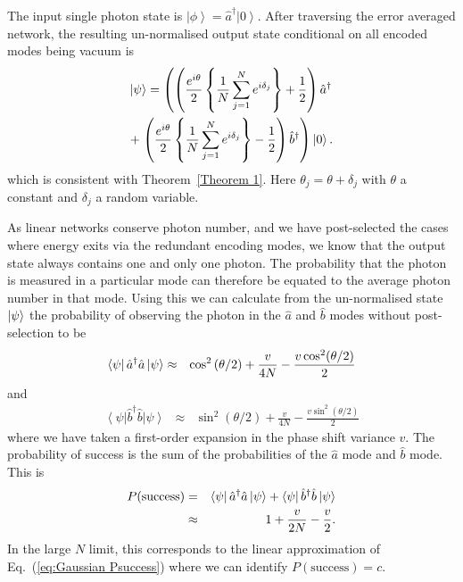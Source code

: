 \documentclass[aps,pra,twocolumn,superscriptaddress,numerical,floatfix]{revtex4-1}
\begin{document}
The input single photon state is $\left|\phi\right\rangle = \hat{a}^{\dagger}\left|0\right\rangle $.  After traversing the error averaged network, the resulting un-normalised output state conditional on all encoded modes being vacuum is
\begin{multline}
	\ket{\psi} = \left(
	\left( \frac{e^{i\theta}}{2} \left\{\frac{1}{N}\sum_{j=1}^{N}e^{i\delta_{j}}\right\} + \frac{1}{2}\right) \hat{a}^{\dagger}  \right. \\
	+ \left. \left(\frac{e^{i\theta}}{2} \left\{\frac{1}{N}\sum_{j=1}^{N}e^{i\delta_{j}}\right\} - \frac{1}{2}\right) \hat{b}^{\dagger} 
	\right)
	\ket{0}.
	\label{eq:1ParbN}
\end{multline}
which is consistent with Theorem~\ref{Theorem 1}. Here $\theta_{j}=\theta+\delta_{j}$ with $\theta$ a constant and $\delta_j$ a random variable. 

As linear networks conserve photon number, and we have post-selected the cases where energy exits via the redundant encoding modes, we know that the output state always contains one and only one photon.  The probability that the photon is measured in a particular mode can therefore be equated to the average photon number in that mode.  Using this we can calculate from the un-normalised state $\ket{\psi}$ the probability of observing the photon in the $\hat{a}$ and $\hat{b}$ modes without post-selection to be 
\begin{eqnarray}
	\bra{\psi} \hat{a}^{\dagger}\hat{a} \ket{\psi} & \approx & \cos^{2}\left(\theta/2\right)+\frac{v}{4N}-\frac{v\cos^{2}(\theta/2)}{2}
\end{eqnarray}
and
\begin{eqnarray}
	\left\langle \psi\right|\hat{b}^{\dagger}\hat{b}\left|\psi\right\rangle & \approx & \sin^{2}\left(\theta/2\right)+\frac{v}{4N}-\frac{v\sin^{2}(\theta/2)}{2}
\end{eqnarray}
where we have taken a first-order expansion in the phase shift variance $v$.
The probability of success is the sum of the probabilities of the $\hat{a}$ mode and $\hat{b}$ mode.  This is 
\begin{eqnarray}
	P(\textrm{success}) & = & \bra{\psi}\hat{a}^{\dagger}\hat{a}\ket{\psi} +\bra{\psi}\hat{b}^{\dagger}\hat{b}\ket{\psi} \\
	& \approx & 1+\frac{v}{2N}-\frac{v}{2}. \label{eq:1pNarbitrary successs}
\end{eqnarray}
In the large $N$ limit, this corresponds to the linear approximation of Eq.~(\ref{eq:Gaussian Psuccess}) where we can identify $P(\textrm{success})=c$. 
\end{document}
